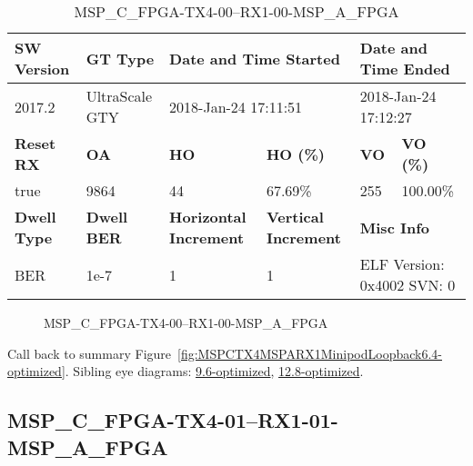 \begin{table}[h]
\centering
\caption{MSP\_C\_FPGA-TX4-00--RX1-00-MSP\_A\_FPGA}
\label{tab:MSPCFPGATX400RX100MSPAFPGA6.4-optimized}
\begin{tabular}{@{}|l|l|l|l|l|l|@{}}
\toprule
\textbf{SW Version}                & \textbf{GT Type}   & \multicolumn{2}{l|}{\textbf{Date and Time Started}}            & \multicolumn{2}{l|}{\textbf{Date and Time Ended}}        \\ \midrule
2017.2                       & UltraScale GTY          & \multicolumn{2}{l|}{2018-Jan-24 17:11:51}                   & \multicolumn{2}{l|}{2018-Jan-24 17:12:27}               \\ \midrule
\textbf{Reset RX}                  & \textbf{OA} & \textbf{HO}   & \textbf{HO (\%)} & \textbf{VO} & \textbf{VO (\%)} \\ \midrule
true & 9864        & 44          & 67.69\%        & 255        & 100.00\%       \\ \midrule
\textbf{Dwell Type}                & \textbf{Dwell BER} & \textbf{Horizontal Increment} & \textbf{Vertical Increment}    & \multicolumn{2}{l|}{\textbf{Misc Info}}                  \\ \midrule
BER                            & 1e-7        & 1        & 1           & \multicolumn{2}{l|}{ELF Version: 0x4002 SVN: 0}                         \\ \bottomrule
\end{tabular}
\end{table}

\begin{figure}[h]
\caption{MSP\_C\_FPGA-TX4-00--RX1-00-MSP\_A\_FPGA} \label{fig:MSPCFPGATX400RX100MSPAFPGA6.4-optimized}
\end{figure}

Call back to summary Figure~\ref{fig:MSPCTX4MSPARX1MinipodLoopback6.4-optimized}.
Sibling eye diagrams: \hyperref[sec:MSPCFPGATX400RX100MSPAFPGA9.6-optimized]{9.6-optimized}, \hyperref[sec:MSPCFPGATX400RX100MSPAFPGA12.8-optimized]{12.8-optimized}.

\clearpage
\newpage


\subsection{MSP\_C\_FPGA-TX4-01--RX1-01-MSP\_A\_FPGA}\label{sec:MSPCFPGATX401RX101MSPAFPGA6.4-optimized}

